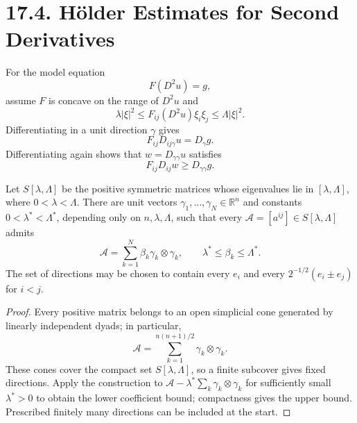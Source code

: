 \section*{17.4. H\"older Estimates for Second Derivatives}

For the model equation
\begin{equation}\tag{17.32}
F(D^2u)=g,
\end{equation}
assume $F$ is concave on the range of $D^2u$ and
\begin{equation}\tag{17.33}
\lambda|\xi|^2\le F_{ij}(D^2u)\xi_i\xi_j\le\Lambda|\xi|^2.
\end{equation}
Differentiating in a unit direction $\gamma$ gives
\begin{equation}
\tag{17.34}
F_{ij}D_{ij\gamma}u=D_\gamma g.
\end{equation}
Differentiating again shows that
$w=D_{\gamma\gamma}u$ satisfies
\begin{equation}\tag{17.35}
F_{ij}D_{ij}w\ge D_{\gamma\gamma}g.
\end{equation}

\begin{lemma}
\label{gt-ch17-lem-finite-directional-decomposition}
Let $S[\lambda,\Lambda]$ be the positive symmetric matrices whose eigenvalues
lie in $[\lambda,\Lambda]$, where $0<\lambda<\Lambda$.  There are unit
vectors $\gamma_1,\ldots,\gamma_N\in\mathbb R^n$ and constants
$0<\lambda^*<\Lambda^*$, depending only on $n,\lambda,\Lambda$, such that
every $\mathcal A=[a^{ij}]\in S[\lambda,\Lambda]$ admits
\begin{equation}\tag{17.38}
\mathcal A=\sum_{k=1}^N\beta_k\gamma_k\otimes\gamma_k,
\qquad \lambda^*\le\beta_k\le\Lambda^*.
\end{equation}
The set of directions may be chosen to contain every $e_i$ and every
$2^{-1/2}(e_i\pm e_j)$ for $i<j$.
\end{lemma}
\begin{proof}
\sketch Every positive matrix belongs to an open simplicial cone generated by
linearly independent dyads; in particular,
\begin{equation}
\tag{17.55}
\mathcal A=\sum_{k=1}^{n(n+1)/2}\gamma_k\otimes\gamma_k.
\end{equation}
These cones cover the
compact set $S[\lambda,\Lambda]$, so a finite subcover gives fixed directions.
Apply the construction to
$\mathcal A-\lambda^*\sum_k\gamma_k\otimes\gamma_k$ for sufficiently small
$\lambda^*>0$ to obtain the lower coefficient bound; compactness gives the
upper bound.  Prescribed finitely many directions can be included at the
start.
\end{proof}

